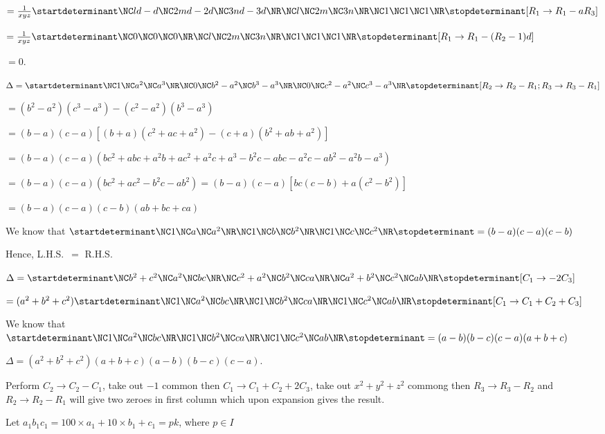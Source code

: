   $= \frac{1}{xyz}\startdeterminant\NC ld - d \NC 2md - 2d \NC 3nd - 3d \NR\NC l \NC
  2m \NC 3n \NR\NC 1 \NC 1 \NC 1\NR\stopdeterminant[R_1\rightarrow R_1 - aR_3]$

  $= \frac{1}{xyz}\startdeterminant\NC 0 \NC 0 \NC 0 \NR\NC l\NC 2m \NC 3n \NR\NC 1 \NC 1 \NC
  1\NR\stopdeterminant[R_1\rightarrow R_1 - (R_2 - 1)d]$

  $=0$.
\item $\Delta = \startdeterminant\NC 1 \NC a^2 \NC a^3 \NR\NC 0 \NC b^2 - a^2 \NC b^3 - a^3
  \NR\NC 0 \NC c^2 -a^2\NC c^3 - a^3\NR\stopdeterminant[R_2 \rightarrow R_2 - R_1; R_3
    \rightarrow R_3 - R_1]$

  $= (b^2 - a^2)(c^3 - a^3) - (c^2 - a^2)(b^3 - a^3)$

  $= (b - a)(c - a)[(b + a)(c^2 + ac + a^2) - (c + a)(b^2 + ab + a^2)]$

  $= (b - a)(c - a)(bc^2 + abc + a^2b + ac^2 + a^2c + a^3 - b^2c - abc - a^2c - ab^2 - a^2b - a^3)$

  $= (b - a)(c - a)(bc^2 + ac^2 - b^2c - ab^2) = (b - a)(c - a)[bc(c - b) + a(c^2 - b^2)]$

  $= (b - a)(c - a)(c - b)(ab + bc + ca)$

  We know that $\startdeterminant\NC 1 \NC a \NC a^2 \NR\NC 1 \NC b \NC b^2
  \NR\NC 1 \NC c \NC c^2\NR\stopdeterminant = (b - a)(c - a)(c - b)$

  Hence, L.H.S.\ $=$ R.H.S.
\item $\Delta = \startdeterminant\NC b^2 + c^2 \NC a^2 \NC bc \NR\NC c^2 + a^2 \NC b^2 \NC
  ca \NR\NC a^2 + b^2 \NC c^2 \NC ab\NR\stopdeterminant[C_1\rightarrow -2C_3]$

  $= (a^2 + b^2 + c^2)\startdeterminant\NC 1 \NC a^2 \NC bc \NR\NC 1 \NC b^2 \NC ca \NR\NC 1
  \NC c^2 \NC ab\NR\stopdeterminant[C_1\rightarrow C_1 + C_2 + C_3]$

  We know that $\startdeterminant\NC1 \NC a^2 \NC bc \NR\NC 1 \NC b^2 \NC ca \NR\NC 1
  \NC c^2 \NC ab\NR\stopdeterminant = (a - b)(b - c)(c - a)(a + b + c)$

  $\Delta = (a^2 + b^2 + c^2)(a + b + c)(a - b)(b - c)(c - a)$.
\item Perform $C_2\rightarrow C_2 - C_1$, take out $-1$ common then $C_1\rightarrow C_1 + C_2 + 2C_3$, take
  out $x^2 + y^2 + z^2$ commong then $R_3\rightarrow R_3 - R_2$ and $R_2\rightarrow R_2 - R_1$ will give two
  zeroes in first column which upon expansion gives the result.
\item Let $a_1b_1c_1 = 100\times a_1 + 10\times b_1 + c_1 = pk$, where
  $p\in I$

